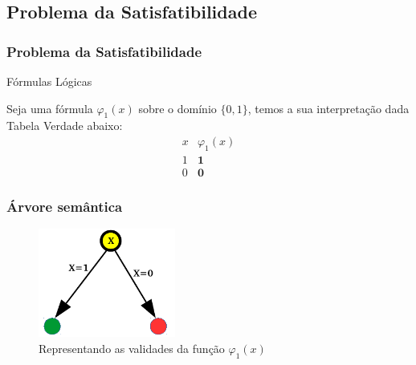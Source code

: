 \documentclass{beamer}
\begin{document}
\subsection{Problema da Satisfatibilidade}

\begin{frame}
\frametitle{Problema da Satisfatibilidade}

\begin{block}{Fórmulas Lógicas}

Seja uma fórmula $\varphi_1 (x)$ sobre  o domínio $\{0 , 1\}$,
temos a sua interpretação dada Tabela Verdade abaixo:
$$
\begin{array}{c|c}
x & \varphi_1 (x)\\\hline
1 & \mathbf{1}\\
0 & \mathbf{0}
\end{array}
$$
\end{block}

\end{frame}


\begin{frame}
\frametitle{Árvore semântica}
\begin{figure}[ht!]
 \centering
 \includegraphics[width=0.4\textwidth , height=0.6\textheight]{x_tree.pdf}
\caption{Representando as validades da função $\varphi_1 (x)$} 
\end{figure}

\end{frame}

\end{document}
